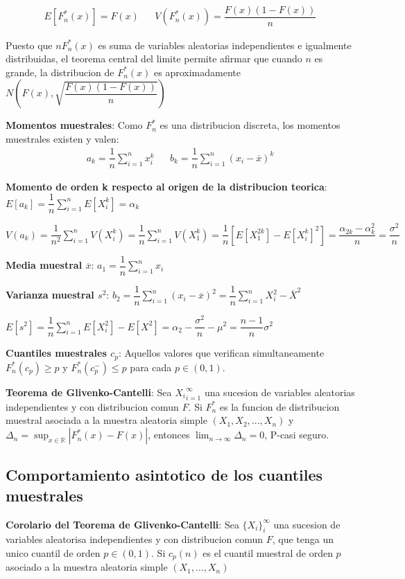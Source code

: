 \documentclass[10pt]{extarticle}
\newcommand{\R}{\mathbb{R}}
\newcommand{\<}{\langle}
\renewcommand{\>}{\rangle}
\theoremstyle{definition}
\begin{document}
\begin{align*}
  E[F_n^*(x)]=F(x) &  & V(F_n^*(x))=\dfrac{F(x) (1-F(x))}{n}
\end{align*}

Puesto que $nF_n^*(x)$ es suma de variables aleatorias independientes e igualmente distribuidas, el teorema central del limite permite afirmar que cuando $n$ es grande, la distribucion de $F_n^*(x)$ es aproximadamente $N(F(x), \sqrt{\dfrac{F(x)(1-F(x))}{n}})$

\textbf{Momentos muestrales}: Como $F_n^*$ es una distribucion discreta, los momentos muestrales existen y valen:
\begin{align*}
  a_k=\dfrac{1}{n}\sum_{i=1}^n x_i^k &  & b_k=\dfrac{1}{n}\sum_{i=1}^n  (x_i - \overline{x})^k
\end{align*}

\textbf{Momento de orden k respecto al origen de la distribucion teorica}: $E[a_k]=\dfrac{1}{n} \sum_{i=1}^n E[X_i^k] = \alpha_k$

$V(a_k)=\dfrac{1}{n^2}\sum_{i=1}^n V(X_i^k)=\dfrac{1}{n}\sum_{i=1}^n V(X_1^k)=\dfrac{1}{n}[E[X_1^{2k}] - E[X_i^k]^2]=\dfrac{\alpha_{2k}-\alpha_k^2}{n}=\dfrac{\sigma^2}{n}$

\textbf{Media muestral $\overline{x}$}: $a_1=\dfrac{1}{n}\sum_{i=1}^n x_i$

\textbf{Varianza muestral $s^2$}: $b_2=\dfrac{1}{n}\sum_{i=1}^n  (x_i - \overline{x})^2=\dfrac{1}{n} \sum_{i=1}^n X_i^2 - \overline{X}^2$

$E[s^2]=\dfrac{1}{n} \sum_{i=1}^n E[X_i^2] - E[X^2]=\alpha_2 - \dfrac{\sigma^2}{n} - \mu^2=\dfrac{n-1}{n}\sigma^2$

\textbf{Cuantiles muestrales $c_p$}: Aquellos valores que verifican simultaneamente $F_n^*(c_p)\geq p$ y $F_n^*(c_p^-)\leq p$ para cada $p \in (0,1)$.


\textbf{Teorema de Glivenko-Cantelli}: Sea ${X_i}_{i=1}^\infty$ una sucesion de variables aleatorias independientes y con distribucion comun $F$. Si $F_n^*$ es la funcion de distribucion muestral asociada a la muestra aleatoria simple $(X_1, X_2,..., X_n)$ y $\Delta_n=\sup_{x\in\R} |F_n^*(x)-F(x)|$, entonces $\lim_{n\to\infty} \Delta_n = 0$, P-casi seguro.

\subsection*{Comportamiento asintotico de los cuantiles muestrales}

\textbf{Corolario del Teorema de Glivenko-Cantelli}: Sea $\{X_i\}_i^\infty$ una sucesion de variables aleatorisa independientes y con distribucion comun $F$, que tenga un unico cuantil de orden $p \in (0,1)$. Si $c_p(n)$ es el cuantil muestral de orden $p$ asociado a la muestra aleatoria simple $(X_1, ..., X_n)$
\end{document}
